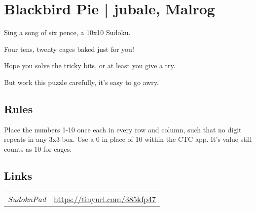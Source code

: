 \section{Blackbird Pie | {\normalfont jubale, Malrog}}
\label{sec:26-blackbird-pie-jubale-malrog}
Sing a song of six pence, a 10x10 Sudoku.

Four tens, twenty cages baked just for you!

Hope you solve the tricky bits, or at least you give a try.

But work this puzzle carefully, it’s easy to go awry.
\subsection*{Rules}
\begin{markdown}
Place the numbers 1-10 once each in every row and column, such that no digit repeats in any 3x3 box.  Use a 0 in place of 10 within the CTC app.  It’s value still counts as 10 for cages. 
\end{markdown}
\subsection*{Links}
\begin{tabularx}{\textwidth}{l X}
\emph{SudokuPad} & \url{https://tinyurl.com/385kfp47} \\
\end{tabularx}
\pagebreak
